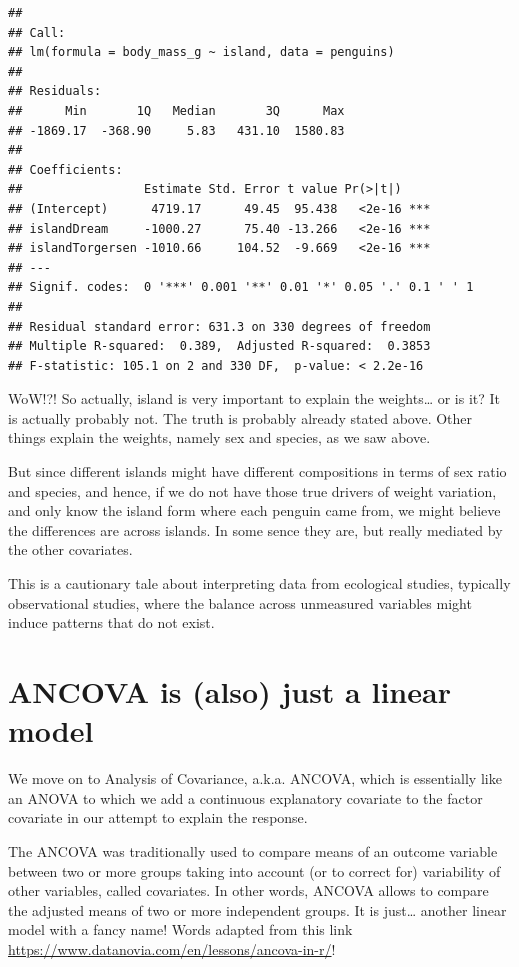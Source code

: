\documentclass[
]{book}
\begin{document}
\begin{verbatim}
## 
## Call:
## lm(formula = body_mass_g ~ island, data = penguins)
## 
## Residuals:
##      Min       1Q   Median       3Q      Max 
## -1869.17  -368.90     5.83   431.10  1580.83 
## 
## Coefficients:
##                 Estimate Std. Error t value Pr(>|t|)    
## (Intercept)      4719.17      49.45  95.438   <2e-16 ***
## islandDream     -1000.27      75.40 -13.266   <2e-16 ***
## islandTorgersen -1010.66     104.52  -9.669   <2e-16 ***
## ---
## Signif. codes:  0 '***' 0.001 '**' 0.01 '*' 0.05 '.' 0.1 ' ' 1
## 
## Residual standard error: 631.3 on 330 degrees of freedom
## Multiple R-squared:  0.389,  Adjusted R-squared:  0.3853 
## F-statistic: 105.1 on 2 and 330 DF,  p-value: < 2.2e-16
\end{verbatim}

WoW!?! So actually, island is very important to explain the weights\ldots{} or is it? It is actually probably not. The truth is probably already stated above. Other things explain the weights, namely sex and species, as we saw above.

But since different islands might have different compositions in terms of sex ratio and species, and hence, if we do not have those true drivers of weight variation, and only know the island form where each penguin came from, we might believe the differences are across islands. In some sence they are, but really mediated by the other covariates.

This is a cautionary tale about interpreting data from ecological studies, typically observational studies, where the balance across unmeasured variables might induce patterns that do not exist.

\chapter{ANCOVA is (also) just a linear model}\label{ANCOVAasLM}

We move on to Analysis of Covariance, a.k.a. ANCOVA, which is essentially like an ANOVA to which we add a continuous explanatory covariate to the factor covariate in our attempt to explain the response.

The ANCOVA was traditionally used to compare means of an outcome variable between two or more groups taking into account (or to correct for) variability of other variables, called covariates. In other words, ANCOVA allows to compare the adjusted means of two or more independent groups. It is just\ldots{} another linear model with a fancy name! Words adapted from this link \url{https://www.datanovia.com/en/lessons/ancova-in-r/}!
\end{document}
